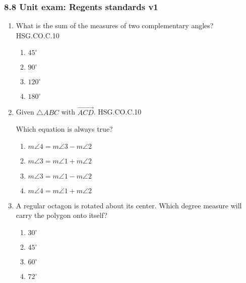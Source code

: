 \documentclass[12pt, twoside]{article}
\begin{document}
\subsubsection*{8.8 Unit exam: Regents standards \hfill v1}
\begin{enumerate}
\item What is the sum of the measures of two complementary angles? \hfill HSG.CO.C.10
\begin{multicols}{2}
\begin{enumerate}
  \item $45^\circ$
  \item $90^\circ$
  \item $120^\circ$
  \item $180^\circ$
\end{enumerate}
\end{multicols}

\item Given $\triangle ABC$ with $\overrightarrow{ACD}$. \hfill HSG.CO.C.10
\begin{center}
\end{center}
Which equation is always true?
\begin{multicols}{2}
\begin{enumerate}
  \item $m\angle 4 = m\angle 3 - m\angle 2$
  \item $m\angle 3 = m\angle 1 + m\angle 2$
  \item $m\angle 3 = m\angle 1 - m\angle 2$
  \item $m\angle 4 = m\angle 1 + m\angle 2$
\end{enumerate}
\end{multicols}

\item A regular octagon is rotated about its center. Which degree measure will carry the polygon onto itself? 
\begin{multicols}{2}
\begin{enumerate}
  \item $30^\circ$
  \item $45^\circ$
  \item $60^\circ$
  \item $72^\circ$
\end{enumerate}
\end{multicols}


\end{enumerate}
\end{document}
